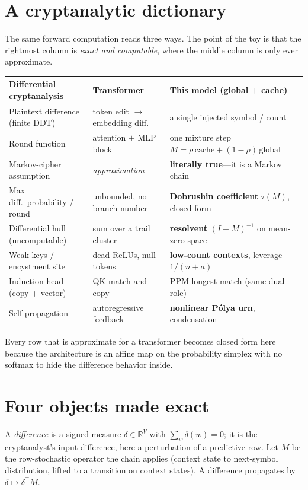 \documentclass[11pt]{article}
\theoremstyle{plain}
\theoremstyle{definition}
\theoremstyle{remark}
\begin{document}
\section{A cryptanalytic dictionary}\label{sec:dict}
The same forward computation reads three ways. The point of the toy is that the rightmost
column is \emph{exact and computable}, where the middle column is only ever approximate.

\begin{center}\small
\begin{tabular}{p{}p{}p{}}
\toprule
Differential cryptanalysis & Transformer & This model (global $+$ cache) \\
\midrule
Plaintext difference (finite DDT) & token edit $\to$ embedding diff. & a single injected
symbol / count \\
Round function & attention $+$ MLP block & one mixture step
$M=\rho\,\text{cache}+(1{-}\rho)\,\text{global}$ \\
Markov-cipher assumption & \emph{approximation} & \textbf{literally true}---it is a Markov
chain \\
Max diff.\ probability / round & unbounded, no branch number & \textbf{Dobrushin coefficient}
$\tau(M)$, closed form \\
Differential hull (uncomputable) & sum over a trail cluster & \textbf{resolvent}
$(I-M)^{-1}$ on mean-zero space \\
Weak keys / encystment site & dead ReLUs, null tokens & \textbf{low-count contexts},
leverage $1/(n+a)$ \\
Induction head (copy + vector) & QK match-and-copy & PPM longest-match (same dual role) \\
Self-propagation & autoregressive feedback & \textbf{nonlinear P\'olya urn}, condensation \\
\bottomrule
\end{tabular}
\end{center}

Every row that is approximate for a transformer becomes closed form here because the
architecture is an affine map on the probability simplex with no softmax to hide the
difference behavior inside.

\section{Four objects made exact}\label{sec:exact}
A \emph{difference} is a signed measure $\delta\in\mathbb R^V$ with $\sum_w\delta(w)=0$; it
is the cryptanalyst's input difference, here a perturbation of a predictive row. Let $M$ be
the row-stochastic operator the chain applies (context state to next-symbol distribution,
lifted to a transition on context states). A difference propagates by $\delta\mapsto
\delta^{\!\top}M$.
\end{document}
